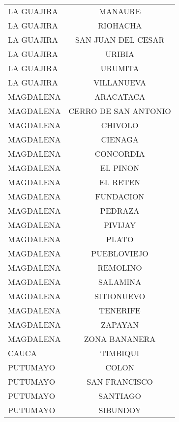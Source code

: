 \documentclass[12pt,a4paper]{article}
\begin{document}
\begin{longtable}{@{}lc@{}}
		LA GUAJIRA            & MANAURE              \\
		LA GUAJIRA            & RIOHACHA             \\
		LA GUAJIRA            & SAN JUAN DEL CESAR   \\
		LA GUAJIRA            & URIBIA               \\
		LA GUAJIRA            & URUMITA              \\
		LA GUAJIRA            & VILLANUEVA           \\
		MAGDALENA             & ARACATACA            \\
		MAGDALENA             & CERRO DE SAN ANTONIO \\
		MAGDALENA             & CHIVOLO              \\
		MAGDALENA             & CIENAGA              \\
		MAGDALENA             & CONCORDIA            \\
		MAGDALENA             & EL PINON             \\
		MAGDALENA             & EL RETEN             \\
		MAGDALENA             & FUNDACION            \\
		MAGDALENA             & PEDRAZA              \\
		MAGDALENA             & PIVIJAY              \\
		MAGDALENA             & PLATO                \\
		MAGDALENA             & PUEBLOVIEJO          \\
		MAGDALENA             & REMOLINO             \\
		MAGDALENA             & SALAMINA             \\
		MAGDALENA             & SITIONUEVO           \\
		MAGDALENA             & TENERIFE             \\
		MAGDALENA             & ZAPAYAN              \\
		MAGDALENA             & ZONA BANANERA        \\
		CAUCA                 & TIMBIQUI             \\
		PUTUMAYO              & COLON                \\
		PUTUMAYO              & SAN FRANCISCO        \\
		PUTUMAYO              & SANTIAGO             \\
		PUTUMAYO              & SIBUNDOY             \\ \bottomrule
\end{longtable}
\end{document}
